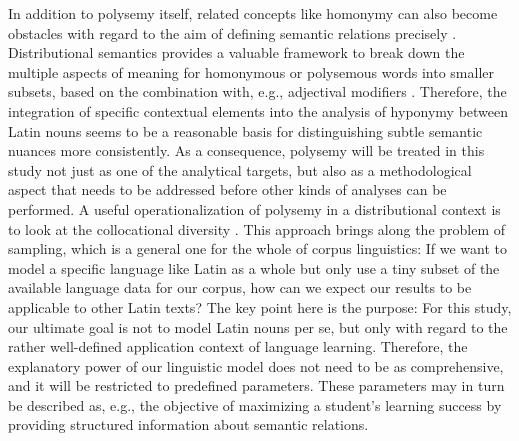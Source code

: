 \documentclass[oneside]{book}
\begin{document}
In addition to polysemy itself, related concepts like homonymy can also become obstacles with regard to the aim of defining semantic relations precisely \parencite[251]{gardnerValidatingConstructWord2007}. Distributional semantics provides a valuable framework to break down the multiple aspects of meaning for homonymous or polysemous words into smaller subsets, based on the combination with, e.g., adjectival modifiers \parencite[42]{boledaIntensionalityWasOnly2013}. Therefore, the integration of specific contextual elements into the analysis of hyponymy between Latin nouns seems to be a reasonable basis for distinguishing subtle semantic nuances more consistently. As a consequence, polysemy will be treated in this study not just as one of the analytical targets, but also as a methodological aspect that needs to be addressed before other kinds of analyses can be performed. A useful operationalization of polysemy in a distributional context is to look at the collocational diversity \parencite[8]{hamiltonDiachronicWordEmbeddings2016}. This approach brings along the problem of sampling, which is a general one for the whole of corpus linguistics: If we want to model a specific language like Latin as a whole but only use a tiny subset of the available language data for our corpus, how can we expect our results to be applicable to other Latin texts? The key point here is the purpose: For this study, our ultimate goal is not to model Latin nouns per se, but only with regard to the rather well-defined application context of language learning. Therefore, the explanatory power of our linguistic model does not need to be as comprehensive, and it will be restricted to predefined parameters. These parameters may in turn be described as, e.g., the objective of maximizing a student's learning success by providing structured information about semantic relations.

\end{document}
